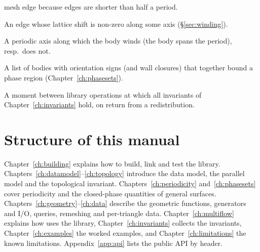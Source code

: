 \begin{description}[style=nextline,leftmargin=2.5em]
  mesh edge because edges are shorter than half a period.
\item[cut edge] An edge whose lattice shift is non-zero along some axis (\S\ref{sec:winding}).
\item[wrapping axis, compact axis] A periodic axis along which the body winds (the body spans the
  period), resp.\ does not.
\item[phase-boundary set] A list of bodies with orientation signs (and wall closures) that
  together bound a phase region (Chapter~\ref{ch:phasesets}).
\item[quiescent point] A moment between library operations at which all invariants of
  Chapter~\ref{ch:invariants} hold, \eg on return from a redistribution.
\end{description}

\section{Structure of this manual}

Chapter~\ref{ch:building} explains how to build, link and test the library.
Chapters~\ref{ch:datamodel}--\ref{ch:topology} introduce the data model, the parallel model and
the topological invariant. Chapters~\ref{ch:periodicity} and~\ref{ch:phasesets} cover periodicity
and the closed-phase quantities of general surfaces. Chapters~\ref{ch:geometry}--\ref{ch:data}
describe the geometric functions, generators and I/O, queries, remeshing and per-triangle data.
Chapter~\ref{ch:multiflow} explains how \multi{} uses the library, Chapter~\ref{ch:invariants}
collects the invariants, Chapter~\ref{ch:examples} the worked examples, and
Chapter~\ref{ch:limitations} the known limitations. Appendix~\ref{app:api} lists the public
API by header.
